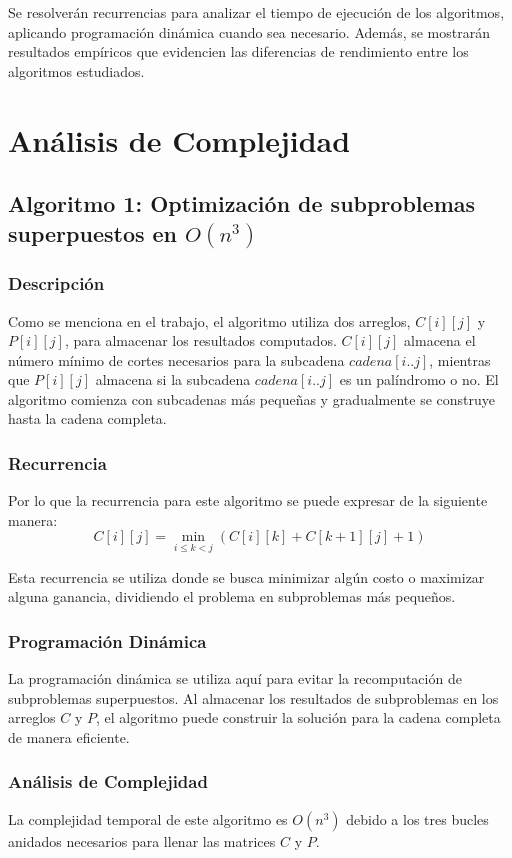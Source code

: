 \documentclass{report}
\begin{document}
Se resolverán recurrencias para analizar el tiempo de ejecución de los algoritmos, aplicando programación dinámica cuando sea necesario. Además, se mostrarán resultados empíricos que evidencien las diferencias de rendimiento entre los algoritmos estudiados.

\section{Análisis de Complejidad}
\subsection{Algoritmo 1: Optimización de subproblemas superpuestos en $O(n^3)$}
\subsubsection{Descripción}
Como se menciona en el trabajo, el algoritmo utiliza dos arreglos, $C[i][j]$ y $P[i][j]$, para almacenar los resultados computados. $C[i][j]$ almacena el número mínimo de cortes necesarios para la subcadena $cadena[i..j]$, mientras que $P[i][j]$ almacena si la subcadena $cadena[i..j]$ es un palíndromo o no. El algoritmo comienza con subcadenas más pequeñas y gradualmente se construye hasta la cadena completa.

\subsubsection{Recurrencia}
Por lo que la recurrencia para este algoritmo se puede expresar de la siguiente manera:
\[
C[i][j] = \min_{i \leq k < j} (C[i][k] + C[k+1][j] + 1)
\]

Esta recurrencia se utiliza donde se busca minimizar algún costo o maximizar alguna ganancia, dividiendo el problema en subproblemas más pequeños.

\subsubsection{Programación Dinámica}
La programación dinámica se utiliza aquí para evitar la recomputación de subproblemas superpuestos. Al almacenar los resultados de subproblemas en los arreglos $C$ y $P$, el algoritmo puede construir la solución para la cadena completa de manera eficiente.

\subsubsection{Análisis de Complejidad}
La complejidad temporal de este algoritmo es $O(n^3)$ debido a los tres bucles anidados necesarios para llenar las matrices $C$ y $P$.
\end{document}
